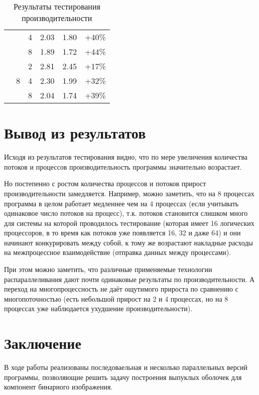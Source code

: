 \documentclass[12pt]{article}
\begin{document}
\begin{table}[H]
\begin{tabular}{|c|c|c|c|c|c|}
                            &                     & 4                & 2.03                  & 1.80               & +40\% \\
                            &                     & 8                & 1.89                  & 1.72               & +44\% \\
\cline{2-6}
                            & \multirow{3}{*}{8}  & 2                & 2.81                  & 2.45               & +17\% \\
                            &                     & 4                & 2.30                  & 1.99               & +32\% \\
                            &                     & 8                & 2.04                  & 1.74               & +39\% \\
\hline
\end{tabular}
\caption{Результаты тестирования производительности}
\end{table}

\newpage

\section{Вывод из результатов}
Исходя из результатов тестирования видно, что по мере увеличения количества потоков и процессов производительность программы значительно возрастает.

Но постепенно с ростом количества процессов и потоков прирост производительности замедляется. Например, можно заметить, что на 8 процессах программа в целом работает медленнее чем на 4 процессах (если учитывать одинаковое число потоков на процесс), т.к. потоков становится слишком много для системы на которой проводилось тестирование (которая имеет 16 логических процессоров, в то время как потоков уже появляется 16, 32 и даже 64) и они начинают конкурировать между собой, к тому же возрастают накладные расходы на межпроцессное взаимодействие (отправка данных между процессами).

При этом можно заметить, что различные применяемые технологии распараллеливания дают почти одинаковые результаты по производительности. А переход на многопроцессность не даёт ощутимого прироста по сравнению с многопоточностью (есть небольшой прирост на 2 и 4 процессах, но на 8 процессах уже наблюдается ухудшение производительности).

\newpage

\section{Заключение}
В ходе работы реализованы последоваельная и несколько параллельных версий программы, позволяющие решить задачу построения выпуклых оболочек для компонент бинарного изображения.
\end{document}
